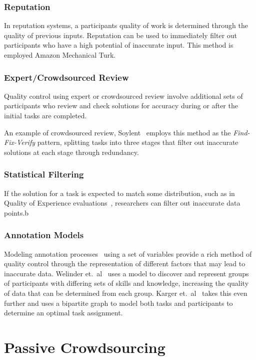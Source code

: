 \documentclass[10pt,twocolumn]{article}
\begin{document}
\subsubsection*{Reputation}
In reputation systems, a participants quality of work is determined through
the quality of previous inputs. Reputation can be used to immediately filter 
out participants who have a high potential of inaccurate input. This method 
is employed Amazon Mechanical Turk.


\subsubsection*{Expert/Crowdsourced Review}
Quality control using expert or crowdsourced review involve additional
sets of participants who review and check solutions for accuracy during 
or after the initial tasks are completed.

An example of crowdsourced review, Soylent~\cite{Bernstein2010} employs 
this method as the \textit{Find-Fix-Verify} pattern, splitting tasks 
into three stages that filter out inaccurate solutions at each stage 
through redundancy.


\subsubsection*{Statistical Filtering}
If the solution for a task is expected to match some distribution, 
such as in Quality of Experience evaluations~\cite{Chen2009}, researchers 
can filter out inaccurate data points.b


\subsubsection*{Annotation Models}
Modeling annotation processes~\cite{Karger,Welinder} using a set of variables 
provide a rich method of quality control through the representation of 
different factors that may lead to inaccurate data. Welinder et.\ 
al~\cite{Welinder} uses a model to discover and represent groups of 
participants with differing sets of skills and knowledge, increasing the 
quality of data that can be determined from each group. Karger et.\ 
al~\cite{Karger} takes this even further and uses a bipartite graph to model 
both tasks and participants to determine an optimal task assignment.


\section{Passive Crowdsourcing}
\label{sec:passive}
\end{document}
